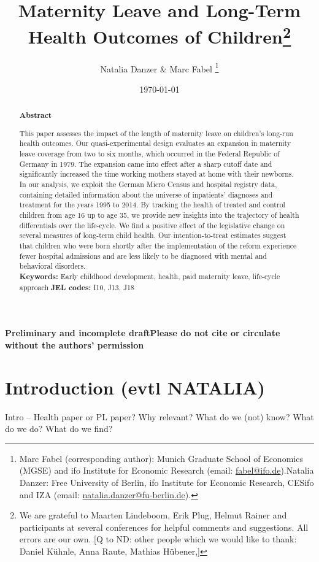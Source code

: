 \documentclass[11pt, a4paper,draft]{article} %
\title{Maternity Leave and Long-Term Health Outcomes of Children\footnote{We are grateful to Maarten Lindeboom, Erik Plug, Helmut Rainer and participants at several conferences for helpful comments and suggestions. All errors are our own.
[Q to ND:  other people which we would like to thank: Daniel Kühnle, Anna Raute, Mathias Hübener,]}}
\author{Natalia Danzer \& Marc Fabel \thanks{Marc Fabel (corresponding author): Munich Graduate School of Economics (MGSE) and ifo Institute for Economic Research (email: \href{mailto:fabel@ifo.de}{fabel@ifo.de}).\newline Natalia Danzer: Free University of Berlin, ifo Institute for Economic Research, CESifo and IZA (email: \href{mailto:natalia.danzer@fu-berlin.de}{natalia.danzer@fu-berlin.de}).}}
\date{\monthyeardate\today}
\begin{document}
\setcounter{page}{0}  
\tableofcontents
\newpage
\setcounter{page}{1}    
\maketitle

\textbf{\color{red} Preliminary and incomplete draft\newline Please do not cite or circulate without the authors' permission}
\renewcommand{\abstractname}{\vspace{-\baselineskip}} %

  \begin{abstract}\noindent 
   \footnotesize{\begin{center}\textbf{Abstract}\end{center} This paper assesses the impact of the length of maternity leave on children’s long-run health outcomes. Our quasi-experimental design evaluates an expansion in maternity leave coverage from two to six months, which occurred in the Federal Republic of Germany in 1979. The expansion came into effect after a sharp cutoff date and significantly increased the time working mothers stayed at home with their newborns. In our analysis, we exploit the German Micro Census and hospital registry data, containing detailed information about the universe of inpatients' diagnoses and treatment for the years 1995 to 2014. By tracking the health of treated and control children from age 16 up to age 35, we provide new insights into the trajectory of health differentials over the life-cycle.
   	We find a positive effect of the legislative change on several measures of long-term child health. Our intention-to-treat estimates suggest that children who were born shortly after the implementation of the reform experience fewer hospital admissions and are less likely to be diagnosed with mental and behavioral disorders.\\\newline \textbf{Keywords:} Early childhood development, health, paid maternity leave, life-cycle approach \newline \textbf{JEL codes:} I10, J13, J18}
    \end{abstract}

\newpage


\section{Introduction (evtl NATALIA)}\label{sec:introduction}
Intro –
Health paper or PL paper?
Why relevant?
What do we (not) know?
What do we do?
What do we find?
 
\end{document}
